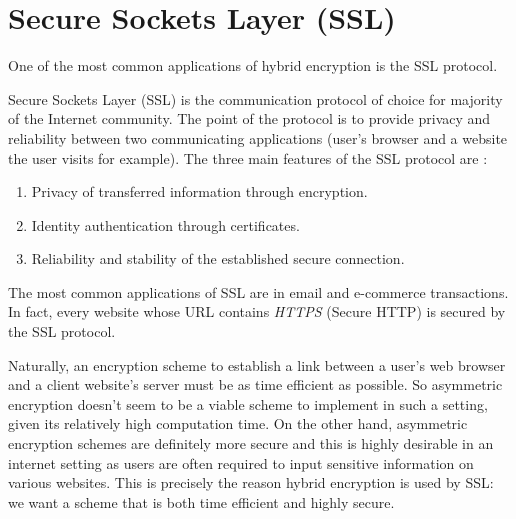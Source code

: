 \section{Secure Sockets Layer (SSL)}

\label{sec:ssl} 

One of the most common applications of hybrid encryption is the SSL protocol.

Secure Sockets Layer (SSL) is the communication protocol of choice for majority of the Internet community. 
The point of the protocol is to provide privacy and reliability between two communicating applications (user's browser and a website the user visits for example). 
The three main features of the SSL protocol are \cite{mckinley}:

\begin{enumerate}
    \item Privacy of transferred information through encryption.
    \item Identity authentication through certificates.
    \item Reliability and stability of the established secure connection.
\end{enumerate}

The most common applications of SSL are in email and e-commerce transactions. 
In fact, every website whose URL contains \emph{HTTPS} (Secure HTTP) is secured by the SSL protocol.

Naturally, an encryption scheme to establish a link between a user's web browser and a client website's server must be as time efficient as possible. 
So asymmetric encryption doesn't seem to be a viable scheme to implement in such a setting, given its relatively high computation time. 
On the other hand, asymmetric encryption schemes are definitely more secure and this is highly desirable in an internet setting as users are often required to input sensitive information on various websites. 
This is precisely the reason hybrid encryption is used by SSL: we want a scheme that is both time efficient and highly secure.

